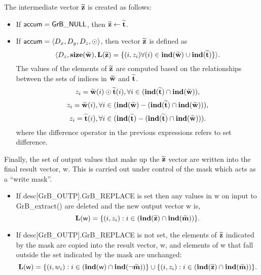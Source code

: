 The intermediate vector ${\bf \widetilde{z}}$ is created as follows:
\begin{itemize}
    \item If ${\sf accum} = {\sf GrB\_NULL}$, then ${\bf \widetilde{z}} \leftarrow {\bf \widetilde{t}}$.

    \item If ${\sf accum} = \langle D_x, D_y, D_z, \odot \rangle$, then vector ${\bf \widetilde{z}}$ is defined as 
        \[ \langle D_z, \bold{size}({\bf \widetilde{w}}), \bold{L}({\bf \widetilde{z}})
		= \{(i,z_{i})  \forall (i) \in \bold{ind}({\bf \widetilde{w}}) \cup 
        \bold{ind}({\bf \widetilde{t}}) \} \rangle.\]
    The values of the elements of ${\bf \widetilde{z}}$ are computed based on the relationships between the sets of indices in ${\bf \widetilde{w}}$ and ${\bf \widetilde{t}}$.
\[
z_{i} = {\bf \widetilde{w}}(i) \odot {\bf \widetilde{t}}(i), \forall i \in  (\bold{ind}({\bf \widetilde{t}}) \cap \bold{ind}({\bf \widetilde{w}})),
\]
\[
z_{i} = {\bf \widetilde{w}}(i), \forall  i \in  (\bold{ind}({\bf \widetilde{w}}) - (\bold{ind}({\bf \widetilde{t}}) \cap \bold{ind}({\bf \widetilde{w}}))),
\]
\[
z_{i} = {\bf \widetilde{t}}(i), \forall  i \in  (\bold{ind}({\bf \widetilde{t}}) - (\bold{ind}({\bf \widetilde{t}}) \cap \bold{ind}({\bf \widetilde{w}}))).
\]
where the difference operator in the previous expressions refers to set difference.
\end{itemize}

Finally, the set of output values that make up the ${\bf \widetilde{z}}$ 
vector are written into the final result vector, {\sf w}. 
This is carried out under control of the mask which acts as a ``write mask''.
\begin{itemize}
\item If {\sf desc[GrB\_OUTP].GrB\_REPLACE} is set then any values in {\sf w} 
on input to {\sf GrB\_extract()} are deleted and the new output vector {\sf w} is,
\[ \bold{L}({\sf w}) = \{(i,z_{i}) : i \in (\bold{ind}({\bf \widetilde{z}}) 
\cap \bold{ind}({\bf \widetilde{m}})) \}. \]

\item If {\sf desc[GrB\_OUTP].GrB\_REPLACE} is not set, the elements of 
${\bf \widetilde{z}}$ indicated by 
the mask are copied into the result vector, {\sf w}, and elements of 
{\sf w} that fall outside the set indicated by the mask are unchanged:
\[ \bold{L}({\sf w}) = \{(i,w_{i}) : i \in (\bold{ind}({\sf w}) 
\cap \bold{ind}(\neg {\bf \widetilde{m}})) \} \cup \{(i,z_{i}) : i \in 
(\bold{ind}({\bf \widetilde{z}}) \cap \bold{ind}({\bf \widetilde{m}})) \}. \]
\end{itemize}

